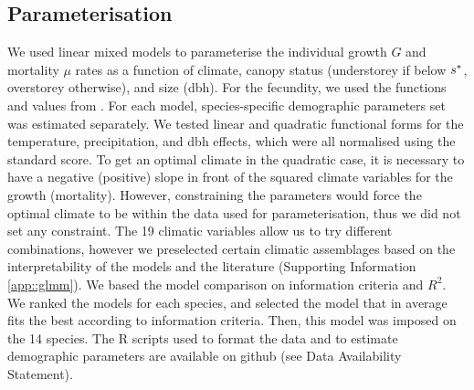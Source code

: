 \subsection{Parameterisation}
We used linear mixed models to parameterise the individual growth $ G $ and mortality $ \mu $ rates as a function of climate, canopy status (understorey if below $ {s}^{*} $, overstorey otherwise), and size (dbh). For the fecundity, we used the functions and values from \citet{Purves2008}. For each model, species-specific demographic parameters set was estimated separately. We tested linear and quadratic functional forms for the temperature, precipitation, and dbh effects, which were all normalised using the standard score. To get an optimal climate in the quadratic case, it is necessary to have a negative (positive) slope in front of the squared climate variables for the growth (mortality). However, constraining the parameters would force the optimal climate to be within the data used for parameterisation, thus we did not set any constraint. The 19 climatic variables allow us to try different combinations, however we preselected certain climatic assemblages based on the interpretability of the models and the literature (Supporting Information \ref{app::glmm}). We based the model comparison on information criteria and $ R^2 $. We ranked the models for each species, and selected the model that in average fits the best according to information criteria. Then, this model was imposed on the 14 species. The R scripts used to format the data and to estimate demographic parameters are available on github (see Data Availability Statement). 


